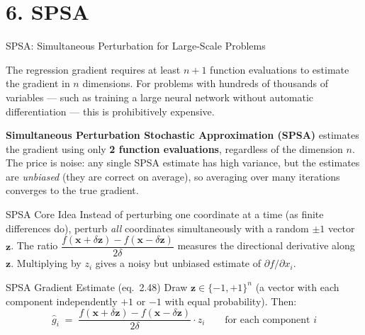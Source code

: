 \documentclass[aspectratio=169,10pt]{beamer}
\newcommand{\x}{\mathbf{x}}
\begin{document}
\section{6. SPSA}

\begin{frame}[allowframebreaks]{SPSA: Simultaneous Perturbation for Large-Scale Problems}

  The regression gradient requires at least $n+1$ function evaluations
  to estimate the gradient in $n$ dimensions.  For problems with hundreds
  of thousands of variables --- such as training a large neural network
  without automatic differentiation --- this is prohibitively expensive.

  \textbf{Simultaneous Perturbation Stochastic Approximation (SPSA)}
  estimates the gradient using only \textbf{2 function evaluations},
  regardless of the dimension $n$.  The price is noise: any single SPSA
  estimate has high variance, but the estimates are \emph{unbiased}
  (they are correct on average), so averaging over many iterations
  converges to the true gradient.

  \begin{block}{SPSA Core Idea}
    Instead of perturbing one coordinate at a time (as finite differences
    do), perturb \emph{all} coordinates simultaneously with a random
    $\pm 1$ vector $\mathbf{z}$.  The ratio
    $\dfrac{f(\x+\delta\mathbf{z}) - f(\x-\delta\mathbf{z})}{2\delta}$
    measures the directional derivative along $\mathbf{z}$.
    Multiplying by $z_i$ gives a noisy but unbiased estimate of
    $\partial f/\partial x_i$.
  \end{block}

  \begin{block}{SPSA Gradient Estimate (eq.\ 2.48)}
    Draw $\mathbf{z} \in \{-1,+1\}^n$ (a vector with each component
    independently $+1$ or $-1$ with equal probability).  Then:
    \[
      \hat{g}_i
      \;=\;
      \frac{f(\x + \delta\mathbf{z}) - f(\x - \delta\mathbf{z})}{2\delta}
      \cdot z_i
      \qquad\text{for each component }i
    \]
  \end{block}


\end{frame}
\end{document}
